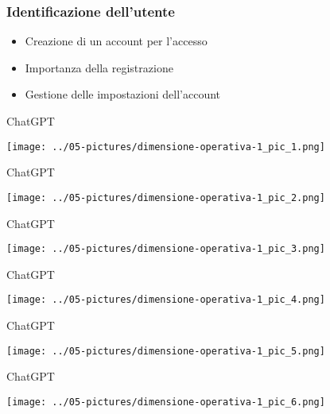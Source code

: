 \documentclass[aspectratio=169]{beamer}
\begin{document}
%
%
\begin{frame}
\frametitle{Identificazione dell'utente}
\begin{itemize}
    \item Creazione di un account per l'accesso
    \item Importanza della registrazione
    \item Gestione delle impostazioni dell'account
\end{itemize}
\end{frame}
%
%
\begin{frame}{ChatGPT}
\begin{center}
\texttt{[image: ../05-pictures/dimensione-operativa-1\_pic\_1.png]} 
\end{center}
\end{frame}
%
%
\begin{frame}{ChatGPT}
\begin{center}
\texttt{[image: ../05-pictures/dimensione-operativa-1\_pic\_2.png]} 
\end{center}
\end{frame}
%
%
\begin{frame}{ChatGPT}
\begin{center}
\texttt{[image: ../05-pictures/dimensione-operativa-1\_pic\_3.png]} 
\end{center}
\end{frame}
%
%
\begin{frame}{ChatGPT}
\begin{center}
\texttt{[image: ../05-pictures/dimensione-operativa-1\_pic\_4.png]} 
\end{center}
\end{frame}
%
%
\begin{frame}{ChatGPT}
\begin{center}
\texttt{[image: ../05-pictures/dimensione-operativa-1\_pic\_5.png]} 
\end{center}
\end{frame}
%
%
\begin{frame}{ChatGPT}
\begin{center}
\texttt{[image: ../05-pictures/dimensione-operativa-1\_pic\_6.png]} 
\end{center}
\end{frame}
\end{document}
